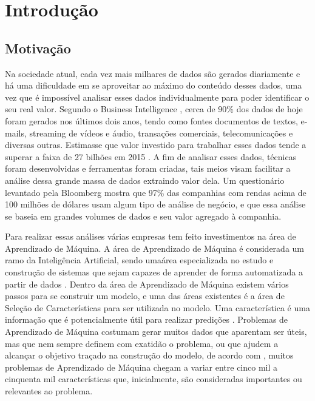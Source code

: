 \chapter[Introdução]{Introdução}


\section{Motivação}
Na sociedade atual, cada vez mais milhares de dados são gerados diariamente e há uma dificuldade em se aproveitar ao máximo do conteúdo desses dados, uma vez que é impossível analisar esses dados individualmente para poder identificar o seu real valor. Segundo o Business Intelligence , cerca de 90\% dos dados de hoje foram gerados nos últimos
dois anos, tendo como fontes documentos de textos, e-mails, streaming de vídeos e áudio, transações comerciais, telecomunicações e diversas outras. Estimasse que valor investido para trabalhar esses dados tende a superar a faixa de 27 bilhões em 2015 .
A fim de analisar esses dados, técnicas foram desenvolvidas e ferramentas foram criadas, tais meios visam facilitar a análise dessa grande massa de dados extraindo valor dela. Um questionário levantado pela Bloomberg  mostra que 97\% das companhias com rendas acima de 100 milhões de dólares usam algum tipo de análise de negócio, e que essa análise se baseia em grandes volumes de dados e seu valor agregado à companhia.

Para realizar essas análises várias empresas tem feito investimentos na área de Aprendizado de Máquina. A área de Aprendizado de Máquina é considerada um ramo da Inteligência Artificial, sendo umaárea especializada no estudo e construção de sistemas que sejam capazes de aprender de forma automatizada a partir de dados \cite{brink2014}. Dentro da área de Aprendizado de Máquina existem vários passos para se construir um modelo, e uma das áreas existentes é a área de Seleção de Características para ser utilizada no modelo. Uma característica é uma informação que é potencialmente útil para realizar predições \cite{mitchell_1997}. Problemas de Aprendizado de Máquina costumam gerar muitos dados que aparentam ser úteis, mas que nem sempre definem  com exatidão o problema, ou que ajudem a alcançar o objetivo traçado na construção do modelo, de acordo com , muitos problemas de Aprendizado de Máquina chegam a variar entre cinco mil a cinquenta mil características que, inicialmente, são consideradas importantes ou relevantes ao problema.

